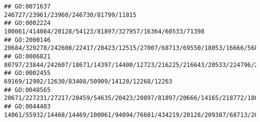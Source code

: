\documentclass[
]{article}
\begin{document}
\begin{verbatim}
## GO:0071637                                                                                                                                                                                                                                                                                                                                                                        246727/23961/23960/246730/81799/11815
## GO:0002224                                                                                                                                                                                                                                                                                                                                                     100061/414084/20128/54123/81897/327957/16364/60533/71398
## GO:2000146                                                                                                                                                                                                                                                                     20684/329278/242608/22417/20423/12515/27007/68713/69550/18053/16666/56838/13134/110168/57277/106014/11815/19876/11629/13078/16149/170942
## GO:0006821                                                                                                                                                                                                                                                                                                                                  80797/23844/242607/18671/14397/14400/12723/216225/216643/20533/224796/24115
## GO:0002455                                                                                                                                                                                                                                                                                                                                                              69169/12902/12630/83408/50909/14128/12268/12263
## GO:0048565                                                                                                                                                                                                                                                                                                                             20671/227231/27217/20459/54635/20423/20897/81897/20666/14165/218772/18092/331063
## GO:0044403                                                                                                                                                                                                                                                                                        14061/55932/14468/14469/100061/94094/76681/434219/20128/209387/68713/20307/20304/12265/71223/54419/57757/224762/16149

\end{verbatim}
\end{document}
